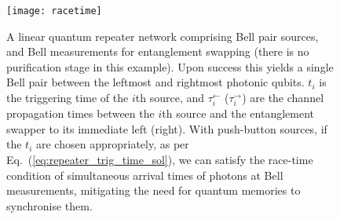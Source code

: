 \begin{figure}[!htbp]
\texttt{[image: racetime]}
\captionspacefig \caption{A linear quantum repeater network comprising Bell pair sources, and Bell measurements for entanglement swapping (there is no purification stage in this example). Upon success this yields a single Bell pair between the leftmost and rightmost photonic qubits. $t_i$ is the triggering time of the $i$th source, and $\tau_i^\leftarrow$ ($\tau_i^\rightarrow$) are the channel propagation times between the $i$th source and the entanglement swapper to its immediate left (right). With push-button sources, if the $t_i$ are chosen appropriately, as per Eq.~(\ref{eq:repeater_trig_time_sol}), we can satisfy the race-time condition of simultaneous arrival times of photons at Bell measurements, mitigating the need for quantum memories to synchronise them.}\label{fig:racetime}	
\end{figure}

